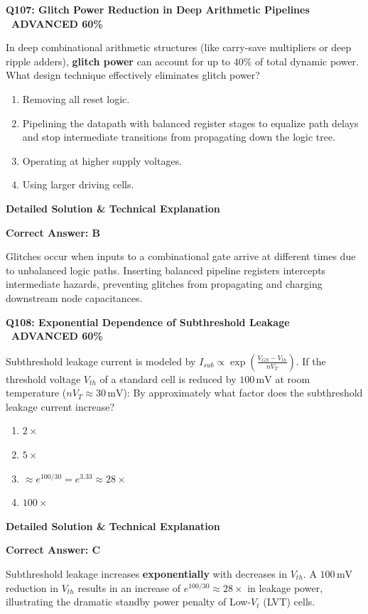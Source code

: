 \documentclass[11pt,a4paper]{article}
\newcommand{\badgeadv}{{\color{white}\colorbox{advred}{\bfseries\sffamily\tiny\ ADVANCED 60\%\ }}}
\newenvironment{qbox}[2]{%
  \begin{mdframed}[style=qstyle]%
  {\bfseries\sffamily\color{primaryblue}#1 \hfill #2}\par\vspace{2pt}%
}{%
  \end{mdframed}%
}
\newenvironment{ansbox}{%
  \begin{mdframed}[style=ansstyle]%
  {\bfseries\sffamily\color{ansgreen}\small Detailed Solution \& Technical Explanation}\par\vspace{2pt}\small%
}{%
  \end{mdframed}%
}
\begin{document}
\begin{qbox}{Q107: Glitch Power Reduction in Deep Arithmetic Pipelines}{\badgeadv}
In deep combinational arithmetic structures (like carry-save multipliers or deep ripple adders), \textbf{glitch power} can account for up to $40\%$ of total dynamic power. What design technique effectively eliminates glitch power?
\begin{enumerate}[label=\textbf{\Alph*.}]
  \item Removing all reset logic.
  \item Pipelining the datapath with balanced register stages to equalize path delays and stop intermediate transitions from propagating down the logic tree.
  \item Operating at higher supply voltages.
  \item Using larger driving cells.
\end{enumerate}
\end{qbox}
\begin{ansbox}
\textbf{Correct Answer: B}

Glitches occur when inputs to a combinational gate arrive at different times due to unbalanced logic paths. Inserting balanced pipeline registers intercepts intermediate hazards, preventing glitches from propagating and charging downstream node capacitances.
\end{ansbox}

\begin{qbox}{Q108: Exponential Dependence of Subthreshold Leakage}{\badgeadv}
Subthreshold leakage current is modeled by $I_{sub} \propto \exp\left(\frac{V_{GS} - V_{th}}{n V_T}\right)$.  
If the threshold voltage $V_{th}$ of a standard cell is reduced by $100\,\text{mV}$ at room temperature ($n V_T \approx 30\,\text{mV}$):
By approximately what factor does the subthreshold leakage current increase?
\begin{enumerate}[label=\textbf{\Alph*.}]
  \item $2\times$
  \item $5\times$
  \item $\approx e^{100/30} = e^{3.33} \approx 28\times$
  \item $100\times$
\end{enumerate}
\end{qbox}
\begin{ansbox}
\textbf{Correct Answer: C}

Subthreshold leakage increases \textbf{exponentially} with decreases in $V_{th}$. A $100\,\text{mV}$ reduction in $V_{th}$ results in an increase of $e^{100/30} \approx 28\times$ in leakage power, illustrating the dramatic standby power penalty of Low-$V_t$ (LVT) cells.
\end{ansbox}
\end{document}
